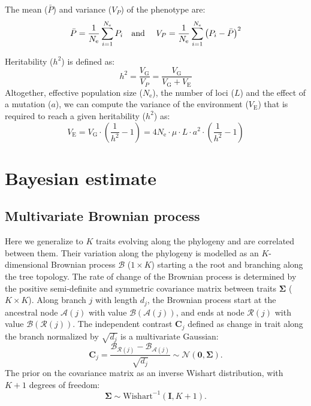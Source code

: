 \documentclass{article}
\newcommand{\Multiply}{\cdot}
\newcommand{\UniDimArray}[1]{\bm{#1}}
\newcommand{\BiDimArray}[1]{\bm{#1}}
\newcommand{\Ne}{N_{\text{e}}}
\newcommand{\Trait}{P}
\newcommand{\Heritability}{h^2}
\newcommand{\VecZero}{\UniDimArray{0}}
\newcommand{\MutationRate}{\mu}
\newcommand{\NbrLoci}{L}
\newcommand{\VarPhenotype}{V_{\Trait}}
\newcommand{\VarGenetic}{V_{\mathrm{G}}}
\newcommand{\VarEnv}{V_{\mathrm{E}}}
\newcommand{\Ntrait}{K}
\newcommand{\contrast}{\UniDimArray{C}}
\newcommand{\Covariancematrix}{\Sigma}
\newcommand{\CovarianceMatrix}{\BiDimArray{\Covariancematrix}}
\newcommand{\Identitymatrix}{\BiDimArray{I}}
\newcommand{\brownian}{\mathcal{B}}
\newcommand{\Brownian}{\UniDimArray{\brownian}}
\begin{document}
The mean ($\bar{\Trait}$) and variance ($\VarPhenotype$) of the phenotype are:
\begin{equation}
    \bar{\Trait} = \frac{1}{\Ne}\sum_{i=1}^{\Ne} \Trait_i \text{\quad and \quad} \VarPhenotype = \frac{1}{\Ne}\sum_{i=1}^{\Ne}\left(\Trait_i - \bar{\Trait} \right)^2 \label{eq:simu-between}
\end{equation}

Heritability ($\Heritability$) is defined as:
\begin{equation}
    \Heritability = \frac{\VarGenetic}{\VarPhenotype} = \frac{\VarGenetic}{\VarGenetic + \VarEnv}\label{eq:simu-heritability}
\end{equation}
Altogether, effective population size ($\Ne$), the number of loci ($\NbrLoci$) and the effect of a mutation ($a$), we can compute the variance of the environment ($\VarEnv$) that is required to reach a given heritability ($\Heritability$) as:
\begin{equation}
    \VarEnv = \VarGenetic \Multiply \left( \frac{1}{\Heritability} - 1 \right) = 4 \Ne \Multiply \MutationRate \Multiply \NbrLoci \Multiply a^2 \Multiply \left( \frac{1}{\Heritability} - 1 \right) \label{eq:simu-var-env}
\end{equation}

\newpage
\section{Bayesian estimate}\label{sec:bayesian-estimate}

\subsection{Multivariate Brownian process}\label{subsec:multivariate-brownian-process}
Here we generalize to $\Ntrait$ traits evolving along the phylogeny and are correlated between them.
Their variation along the phylogeny is modelled as an $\Ntrait$-dimensional Brownian process $\Brownian$ ($1 \times \Ntrait$) starting a the root and branching along the tree topology.
The rate of change of the Brownian process is determined by the positive semi-definite and symmetric covariance matrix between traits $\CovarianceMatrix$ ($\Ntrait \times \Ntrait$).
Along branch $j$ with length $d_{j}$, the Brownian process start at the ancestral node $\mathcal{A}(j)$ with value $\Brownian(\mathcal{A}(j))$, and ends at node $\mathcal{R}(j)$  with value $\Brownian(\mathcal{R}(j))$.
The independent contrast $\contrast_{j}$ defined as change in trait along the branch normalized by $\sqrt {d_{j}}$ is a multivariate Gaussian:
\begin{equation}
    \label{eq:DistribBrownian}
    \contrast_{j} = \frac{\Brownian_{\mathcal{R}(j)} - \Brownian_{\mathcal{A}(j)} }{\sqrt {d_{j}}} \sim \mathcal{N}\left(\VecZero, \CovarianceMatrix \right).
\end{equation}
The {prior} on the covariance matrix as an inverse Wishart distribution, with $\Ntrait + 1$ degrees of freedom:
\begin{equation}
    \label{eq:Distribcovariance}
    \CovarianceMatrix \sim \text{Wishart}^{-1} (\Identitymatrix, \Ntrait + 1).
\end{equation}
\end{document}
